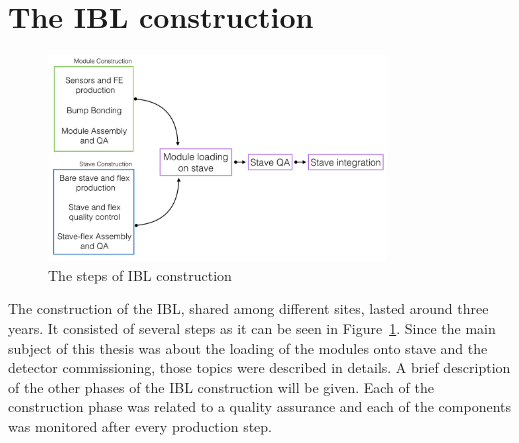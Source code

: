 \section{The IBL construction}\label{sec:IBL_constr_QA}
\begin{figure}
\includegraphics[width=0.8\textwidth]{Images/ibl_stave_loading/Conclusions/construction_steps.png}
\caption{The steps of IBL construction}
\label{pic:construction_steps}
\end{figure}
The construction of the IBL, shared among different sites, lasted around three years. It consisted of several steps as it can be seen in Figure~\ref{pic:construction_steps}.
Since the main subject of this thesis was about the loading of the modules onto stave and the detector commissioning, those topics were described in details. A brief description of the other phases of the IBL construction will be given. Each of the construction phase was related to a quality assurance and each of the components was monitored after every production step.

